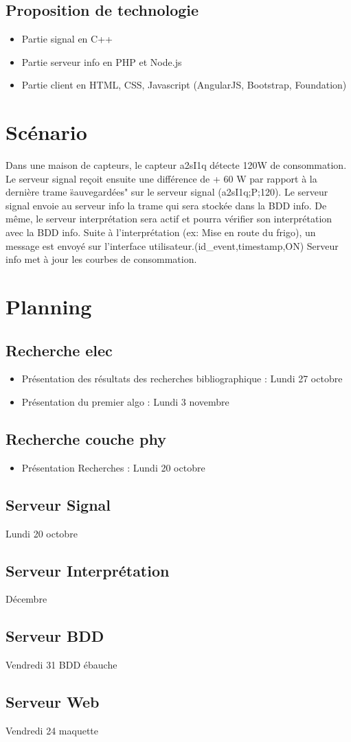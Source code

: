 \documentclass[10pt,a4paper]{article}
\begin{document}
\subsection{Proposition de technologie}
\begin{itemize}
\item Partie signal en C++
\item Partie serveur info en PHP et Node.js
\item Partie client en HTML, CSS, Javascript (AngularJS, Bootstrap, Foundation)
\end{itemize}

\section{Scénario}
Dans une maison de capteurs, le capteur a2sI1q détecte 120W de consommation.
Le serveur signal reçoit ensuite une différence de + 60 W par rapport à la dernière trame \"sauvegardées" sur le serveur signal
(a2sI1q;P;120).
Le serveur signal envoie au serveur info la trame qui sera stockée dans la BDD info. De même, le serveur interprétation sera actif et pourra vérifier son interprétation avec la BDD info.
Suite à l'interprétation (ex: Mise en route du frigo), un message est envoyé sur l'interface utilisateur.(id\_event,timestamp,ON)
Serveur info met à jour les courbes de consommation.

\section{Planning}
\subsection{Recherche elec}
\begin{itemize}
	\item Présentation des résultats des recherches bibliographique : Lundi 27 octobre
	\item Présentation du premier algo : Lundi 3 novembre
\end{itemize}
\subsection{Recherche couche phy}
\begin{itemize}
	\item Présentation Recherches : Lundi 20 octobre
\end{itemize}
\subsection{Serveur Signal}
Lundi 20 octobre
\subsection{Serveur Interprétation}
Décembre
\subsection{Serveur BDD}
Vendredi 31 BDD ébauche
\subsection{Serveur Web}
Vendredi 24 maquette
\end{document}
